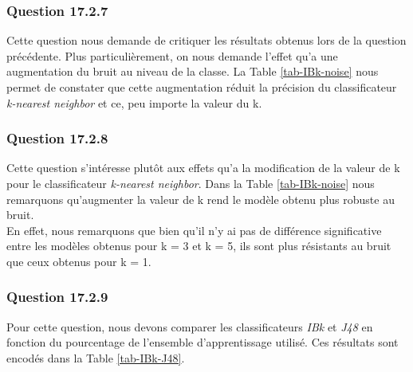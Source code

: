 \documentclass[11pt,a4paper]{article}
\begin{document}
			\subsubsection*{Question 17.2.7}
			
				Cette question nous demande de critiquer les résultats obtenus lors de la question précédente. Plus particulièrement, on nous demande l'effet qu'a une augmentation du bruit au niveau de la classe. La Table \ref{tab-IBk-noise} nous permet de constater que cette augmentation réduit la précision du classificateur \textit{k-nearest neighbor} et ce, peu importe la valeur du k.
				
				\subsubsection*{Question 17.2.8}
				
				Cette question s'intéresse plutôt aux effets qu'a la modification de la valeur de k pour le classificateur \textit{k-nearest neighbor}. Dans la Table \ref{tab-IBk-noise} nous remarquons qu'augmenter la valeur de k rend le modèle obtenu plus robuste au bruit.\\
				
				En effet, nous remarquons que bien qu'il n'y ai pas de différence significative entre les modèles obtenus pour k = 3 et k = 5, ils sont plus résistants au bruit que ceux obtenus pour k = 1.
				
			\newpage
				
			\subsubsection*{Question 17.2.9}
				Pour cette question, nous devons comparer les classificateurs \textit{IBk} et \textit{J48} en fonction du pourcentage de l'ensemble d'apprentissage utilisé. Ces résultats sont encodés dans la Table \ref{tab-IBk-J48}.
			
\end{document}
